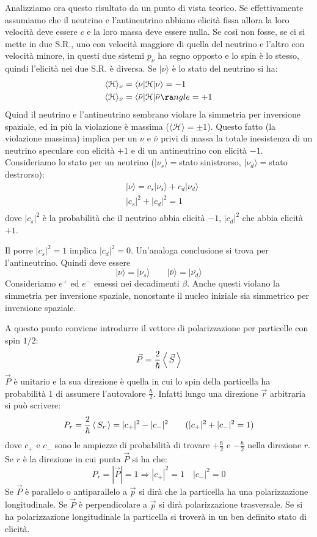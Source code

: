 Analizziamo ora questo risultato da un punto di vista teorico. Se 
effettivamente assumiamo che il neutrino e l'antineutrino abbiano elicità 
fissa allora la loro velocità deve essere $c$
e la loro  massa deve essere nulla. Se così non fosse, se ci si mette in due 
S.R., uno con velocità maggiore di quella del neutrino e l'altro con velocità 
minore, in questi due sistemi $p_{\nu}$
ha segno opposto e lo spin è lo stesso, quindi l'elicità nei due S.R. è 
diversa. Se $|\nu\rangle$ è lo stato del neutrino si ha:
\begin{align*}
&\langle\mathcal{H}\rangle_{\nu}=\langle\nu|\mathcal{H}|\nu\rangle=-1\\
&\langle\mathcal{H}\rangle_{\bar{\nu}}=\langle\bar{\nu}|\mathcal{H}|\bar{\nu}\ra
ngle=+1
\end{align*}
Quind il neutrino e l'antineutrino sembrano violare la simmetria per inversione 
spaziale, ed in più la violazione è massima 
($\langle\mathcal{H}\rangle=\pm1$).
Questo fatto (la violazione massima) implica per un $\nu$ e $\bar{\nu}$ privi 
di massa la totale inesistenza di un neutrino speculare con elicità $+1$
e di un antineutrino con elicità $-1$. Consideriamo lo stato per un neutrino 
($|\nu_s\rangle=$stato sinistrorso, $|\nu_d\rangle=$stato destrorso):
\begin{align*}
&|\nu\rangle=c_s|\nu_s\rangle+c_d|\nu_d\rangle\\
&|c_s|^2+|c_d|^2=1\\
\end{align*}
dove $|c_s|^2$ è la probabilità che il neutrino abbia elicità $-1$, 
$|c_d|^2$ che abbia elicità $+1$.

Il porre $|c_s|^2=1$ implica $|c_d|^2=0$. Un'analoga conclusione si trova per 
l'antineutrino. Quindi deve essere
\[
|\nu\rangle=|\nu_s\rangle\qquad |\bar{\nu}\rangle=|\bar{\nu_d}\rangle
\]
Consideriamo $e^+$ ed $e^-$ emessi nei decadimenti $\beta$. Anche questi violano
la simmetria per inversione spaziale, nonostante il nucleo iniziale sia 
simmetrico per inversione
spaziale.

A questo punto conviene introdurre il vettore di polarizzazione per particelle 
con spin $1/2$:
\[
  \vec{P}=\frac{2}{\hbar}\left\langle\, \vec{S} \,\right\rangle
\]
$\vec{P}$ è unitario e la sua direzione è quella in cui lo spin della 
particella ha probabilità 1 di assumere l'autovalore $\frac{\hbar}{2}$. 
Infatti lungo una direzione $\vec{r}$ arbitraria
si può scrivere:
\[
  P_r=\frac{2}{\hbar}\left\langle\, S_r \,\right\rangle=|c_+|^2-|c_-|^2\qquad (|c_+|^2+|c_-|^2=1)
\]
dove $c_+$ e $c_-$ sono le ampiezze di probabilità di trovare 
$+\frac{\hbar}{2}$ e $-\frac{\hbar}{2}$ nella direzione $r$. Se $r$ è la 
direzione in cui punta $\vec{P}$ si ha che:
\[
P_r=|\vec{P}|=1\Rightarrow|c_+|^2=1\quad|c_-|^2=0
\]
Se $\vec{P}$ è parallelo o antiparallelo a $\vec{p}$ si dirà che la 
particella ha una polarizzazione longitudinale. Se $\vec{P}$ è perpendicolare 
a $\vec{p}$ si dirà
polarizzazione trasversale. Se si ha polarizzazione longitudinale la particella 
si troverà in un ben definito stato di elicità.
